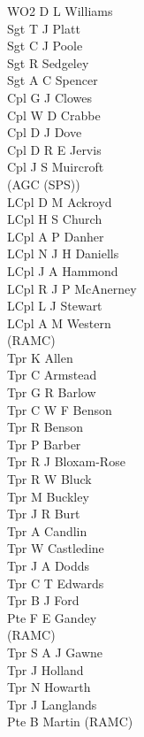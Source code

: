 \begin{multicols}{4}
  \footnotesize
  \noindent
  WO2 D L Williams \\
  Sgt T J Platt \\
  Sgt C J Poole \\
  Sgt R Sedgeley \\
  Sgt A C Spencer \\
  Cpl G J Clowes \\
  Cpl W D Crabbe \\
  Cpl D J Dove \\
  Cpl D R E Jervis \\
  Cpl J S Muircroft \\ \indent (AGC (SPS)) \\
  LCpl D M Ackroyd \\
  LCpl H S Church \\
  LCpl A P Danher \\
  LCpl N J H Daniells \\
  LCpl J A Hammond \\
  LCpl R J P McAnerney \\
  LCpl L J Stewart \\
  LCpl A M Western \\ \indent (RAMC) \\
  Tpr K Allen \\
  Tpr C Armstead \\
  Tpr G R Barlow \\
  Tpr C W F Benson \\
  Tpr R Benson \\
  Tpr P Barber \\
  Tpr R J Bloxam-Rose \\
  Tpr R W Bluck \\
  Tpr M Buckley \\
  Tpr J R Burt \\
  Tpr A Candlin \\
  Tpr W Castledine \\
  Tpr J A Dodds \\
  Tpr C T Edwards \\
  Tpr B J Ford \\
  Pte F E Gandey \\ \indent (RAMC) \\
  Tpr S A J Gawne \\
  Tpr J Holland \\
  Tpr N Howarth \\
  Tpr J Langlands \\
  Pte B Martin (RAMC) \\

\end{multicols}
